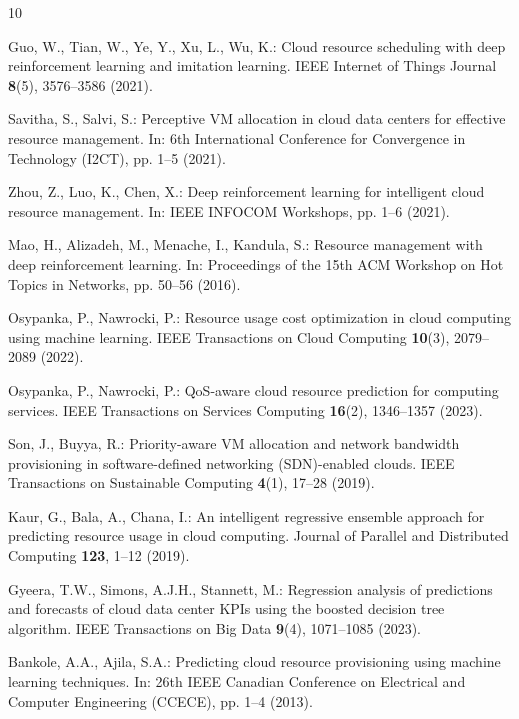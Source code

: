 \documentclass[runningheads]{llncs}
\begin{document}
\begin{thebibliography}{10}

Guo, W., Tian, W., Ye, Y., Xu, L., Wu, K.: Cloud resource scheduling
with deep reinforcement learning and imitation learning. IEEE Internet
of Things Journal \textbf{8}(5), 3576--3586 (2021).

Savitha, S., Salvi, S.: Perceptive VM allocation in cloud data centers
for effective resource management. In: 6th International Conference
for Convergence in Technology (I2CT), pp. 1--5 (2021).

Zhou, Z., Luo, K., Chen, X.: Deep reinforcement learning for
intelligent cloud resource management. In: IEEE INFOCOM Workshops,
pp. 1--6 (2021). 

Mao, H., Alizadeh, M., Menache, I., Kandula, S.: Resource management
with deep reinforcement learning. In: Proceedings of the 15th ACM
Workshop on Hot Topics in Networks, pp. 50--56 (2016).

Osypanka, P., Nawrocki, P.: Resource usage cost optimization in cloud
computing using machine learning. IEEE Transactions on Cloud Computing
\textbf{10}(3), 2079--2089 (2022). 

Osypanka, P., Nawrocki, P.: QoS-aware cloud resource prediction for
computing services. IEEE Transactions on Services Computing
\textbf{16}(2), 1346--1357 (2023). 

Son, J., Buyya, R.: Priority-aware VM allocation and network bandwidth
provisioning in software-defined networking (SDN)-enabled clouds. IEEE
Transactions on Sustainable Computing \textbf{4}(1), 17--28 (2019).

Kaur, G., Bala, A., Chana, I.: An intelligent regressive ensemble
approach for predicting resource usage in cloud computing. Journal of
Parallel and Distributed Computing \textbf{123}, 1--12 (2019).

Gyeera, T.W., Simons, A.J.H., Stannett, M.: Regression analysis of
predictions and forecasts of cloud data center KPIs using the boosted
decision tree algorithm. IEEE Transactions on Big Data \textbf{9}(4),
1071--1085 (2023). 

Bankole, A.A., Ajila, S.A.: Predicting cloud resource provisioning
using machine learning techniques. In: 26th IEEE Canadian Conference
on Electrical and Computer Engineering (CCECE), pp. 1--4 (2013).

\end{thebibliography}
\end{document}
